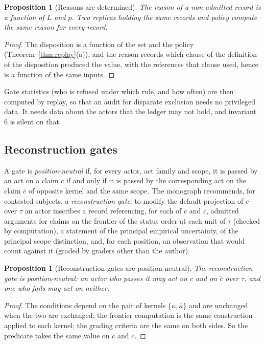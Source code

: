 \documentclass[11pt]{article}
\theoremstyle{plain}
\newtheorem{proposition}[theorem]{Proposition}
\theoremstyle{definition}
\theoremstyle{remark}
\begin{document}
\begin{proposition}[Reasons are determined]\label{prop:reasondet}
The reason of a non-admitted record is a function of $L$ and $p$. Two replicas holding the same records and policy compute the same reason for every record.
\end{proposition}

\begin{proof}
The disposition is a function of the set and the policy (Theorem~\ref{thm:replay}(a)), and the reason records which clause of the definition of the disposition produced the value, with the references that clause used, hence is a function of the same inputs.
\end{proof}

Gate statistics (who is refused under which rule, and how often) are then computed by replay, so that an audit for disparate exclusion needs no privileged data. It needs data about the actors that the ledger may not hold, and invariant 6 is silent on that.

\subsection{Reconstruction gates}\label{sec:recon}

A gate is \emph{position-neutral} if, for every actor, act family and scope, it is passed by an act on a claim $c$ if and only if it is passed by the corresponding act on the claim $\bar c$ of opposite kernel and the same scope. The monograph recommends, for contested subjects, a \emph{reconstruction gate}: to modify the default projection of $c$ over $\tau$ an actor inscribes a record referencing, for each of $c$ and $\bar c$, admitted arguments for claims on the frontier of the status order at each unit of $\tau$ (checked by computation), a statement of the principal empirical uncertainty, of the principal scope distinction, and, for each position, an observation that would count against it (graded by graders other than the author).

\begin{proposition}[Reconstruction gates are position-neutral]\label{prop:reconneutral}
The reconstruction gate is position-neutral: an actor who passes it may act on $c$ and on $\bar c$ over $\tau$, and one who fails may act on neither.
\end{proposition}

\begin{proof}
The conditions depend on the pair of kernels $\{\kappa,\bar\kappa\}$ and are unchanged when the two are exchanged; the frontier computation is the same construction applied to each kernel; the grading criteria are the same on both sides. So the predicate takes the same value on $c$ and $\bar c$.
\end{proof}
\end{document}
